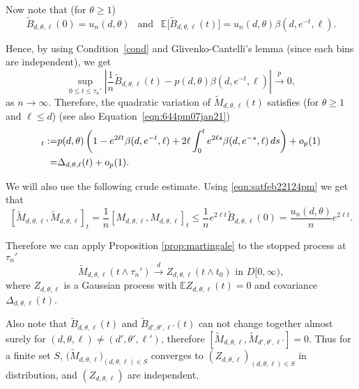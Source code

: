 \documentclass[11pt]{article}
\def\tod{\stackrel{d}{\longrightarrow}}
\def\top{\stackrel{p}{\longrightarrow}}
\def\tod{\stackrel{d}{\longrightarrow}}
\def\top{\stackrel{p}{\longrightarrow}}
\begin{document}
Now note that (for $\theta\geq 1$)
\begin{equation*}%
\widetilde{B}_{d,\theta,\ell}(0) = u_n(d,\theta) \ \  \text{   and   } \ \ \mathbb{E}\bigl[\widetilde{B}_{d,\theta,\ell}(t)\bigr] = u_n(d,\theta) \beta(d,e^{-t},\ell).
\end{equation*}

 

Hence, by using Condition~\ref{cond} and Glivenko-Cantelli's lemma (since each bins are independent), we get 
\begin{equation}
\label{eqn:612pm16may22}
\sup_{0\leq t\leq \tau_n'}\left|\frac{1}{n}\widetilde{B}_{d,\theta,\ell}(t)-p(d,\theta)\beta(d,e^{-t},\ell)\right|\top 0,
\end{equation}
as $n\to \infty$. Therefore, the quadratic variation of $\widetilde{M}_{d,\theta,\ell}(t)$ satisfies (for $\theta\geq 1$ and $\ell \leq d$) (see also Equation~\ref{eqn:644pm07jan21})
 \begin{align*}%
   [\widetilde{M}_{d,\theta,\ell}, \widetilde{M}_{d,\theta,\ell}]_t :=& p(d,\theta)\left(1-e^{2\ell t}\beta(d,e^{-t},\ell) +  2\ell  \int_{0}^t e^{2\ell s}\beta(d,e^{-s},\ell) \, ds  \right)+o_p(1)\notag\\
    =& \Delta_{d,\theta,\ell}(t) +o_p(1).
\end{align*} 

We will also use the following crude estimate. Using \eqref{eqn:satfeb22124pm} we get that
\begin{equation}\label{eqn:aug24942pm}
[\widetilde{M}_{d,\theta,\ell}, \widetilde{M}_{d,\theta,\ell}]_t = \frac{1}{n} [M_{d,\theta,\ell},M_{d,\theta,\ell}]_t \leq \frac{1}{n} e^{2\ell t} \widetilde{B}_{d,\theta,\ell}(0)= \frac{u_n(d,\theta)}{n} e^{2\ell t}.
\end{equation}

Therefore we can apply Proposition \ref{prop:martingale} to the stopped process at $\tau_n'$
\begin{equation}\label{eqn:satfeb22135pm}
\widetilde{M}_{d,\theta,\ell}(t \wedge \tau_n') \tod Z_{d,\theta,\ell}(t \wedge t_0) \text{  in  }D[0,\infty),
\end{equation}
where $Z_{d,\theta,\ell}$ is a Gaussian process with $\mathbb{E}Z_{d,\theta,\ell}(t) =0$ and covariance $\Delta_{d,\theta,\ell}(t)$.


Also note that $\widetilde{B}_{d,\theta,\ell}(t)$ and $\widetilde{B}_{d',\theta',\ell'}(t)$ can not change together almost surely for $(d,\theta,\ell)\neq (d',\theta',\ell')$, therefore $[\widetilde{M}_{{d,\theta,\ell}}, \widetilde{M}_{{d', \theta', \ell'}}] = 0$. Thus for a finite set $S$, $\bigl(\widetilde{M}_{d,\theta,\ell}\bigr)_{(d,\theta,\ell)\in S}$ converges to $(Z_{d,\theta,\ell})_{(d,\theta,\ell)\in S}$ in distribution, and $(Z_{d,\theta,\ell})$ are independent. 
\end{document}
